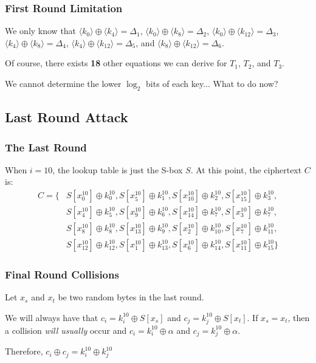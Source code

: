 \documentclass[9pt,handout]{beamer}
\begin{document}
\begin{frame}
	\frametitle{First Round Limitation}
We only know that $\langle k_0 \rangle \oplus \langle k_4 \rangle = \Delta_1$, $\langle k_0 \rangle \oplus \langle k_8 \rangle = \Delta_2$,
$\langle k_0 \rangle \oplus \langle k_{12} \rangle = \Delta_3$, $\langle k_4 \rangle \oplus \langle k_8 \rangle = \Delta_4$, 
$\langle k_4 \rangle \oplus \langle k_{12} \rangle = \Delta_5$, and $\langle k_8 \rangle \oplus \langle k_{12} \rangle = \Delta_6$.

\bigskip

Of course, there exists \textbf{18} other equations we can derive for $T_1$, $T_2$, and $T_3$.

\bigskip

We cannot determine the lower $\log_2$ bits of each key... What to do now?

\end{frame}

\subsection{Last Round Attack}
\begin{frame}
	\frametitle{The Last Round}
	When $i = 10$, the lookup table is just the S-box $S$. At this point, the ciphertext $C$ is:
\begin{align*}
C = \{ & S[x_0^{10}] \oplus k_0^{10}, S[x_5^{10}] \oplus k_1^{10}, S[x_{10}^{10}] \oplus k_2^{10}, S[x_{15}^{10}] \oplus k_3^{10}, \\
& S[x_4^{10}] \oplus k_5^{10}, S[x_9^{10}] \oplus k_6^{10}, S[x_{14}^{10}] \oplus k_7^{10}, S[x_3^{10}] \oplus k_7^{10}, \\
& S[x_8^{10}] \oplus k_8^{10}, S[x_{13}^{10}] \oplus k_9^{10}, S[x_2^{10}] \oplus k_{10}^{10}, S[x_7^{10}] \oplus k_{11}^{10}, \\
& S[x_{12}^{10}] \oplus k_{12}^{10}, S[x_{1}^{10}] \oplus k_{13}^{10}, S[x_6^{10}] \oplus k_{14}^{10}, S[x_{11}^{10}] \oplus k_{15}^{10}\} 
\end{align*}
\end{frame}

\begin{frame}
	\frametitle{Final Round Collisions}
	Let $x_s$ and $x_t$ be two random bytes in the last round. 
	
	\bigskip
	
	We will always have that $c_i = k_i^{10} \oplus S[x_s]$ and $c_j = k_j^{10} \oplus S[x_t]$. If $x_s = x_t$, then a collision \emph{will usually} occur
	and $c_i = k_i^{10} \oplus \alpha$ and $c_j = k_j^{10} \oplus \alpha$.
	
	\bigskip

	Therefore, $c_i \oplus c_j = k_i^{10} \oplus k_j^{10}$
	
\end{frame}
\end{document}
